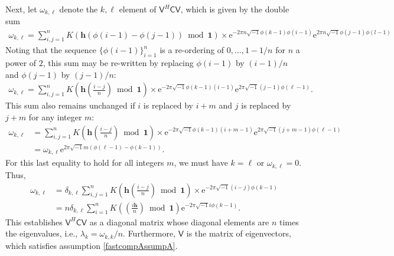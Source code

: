 \documentclass{iitthesis}          %
\newcommand{\bm}[1]{\boldsymbol{#1}}
\newcommand{\vh}{\bm{h}}
\newcommand{\vone}{\bm{1}}
\newcommand{\mC}{\mathsf{C}}
\newcommand{\mV}{\mathsf{V}}
\newcommand{\me}{\mathrm{e}}
\begin{document}
Next, let $\omega_{k, \ell}$ denote the $k,\ell$ element of $\mV^H \mC \mV$, which is given by the double sum
\begin{align*}
\omega_{k, \ell} = \sum_{i,j=1}^n K(\vh(\phi(i-1) - \phi(j-1)) \bmod \vone ) 
\times   \me^{-2 \pi n \sqrt{-1} \phi(k-1)\phi(i-1)}  \me^{2 \pi n \sqrt{-1} \phi(j-1)\phi(l-1)}
\end{align*}
Noting that the sequence $\{\phi(i-1)\}_{i=1}^n$ is a re-ordering of $0, \ldots, 1-1/n$ for $n$ a power of $2$, this sum may be re-written by replacing $\phi(i-1)$ by $(i-1)/n$ and $\phi(j-1)$ by $(j-1)/n$:
\begin{align*}
\omega_{k, \ell} = \sum_{i,j=1}^n K\left (\vh \left(\frac{i-j}{n} \right) \bmod \vone \right) 
\times   \me^{-2 \pi \sqrt{-1} \phi(k-1)(i-1)}  \me^{2 \pi \sqrt{-1} (j-1)\phi(\ell-1)}.
\end{align*}
This sum also remains unchanged if $i$ is replaced by $i+m$ and $j$ is replaced by $j+m$ for any integer $m$:
\begin{align*}
\omega_{k, \ell} &= \sum_{i,j=1}^n K\left (\vh \left(\frac{i-j}{n} \right) \bmod \vone \right) 
\times   \me^{-2 \pi \sqrt{-1} \phi(k-1)(i+m-1)}  \me^{2 \pi \sqrt{-1} (j+m-1)\phi(\ell-1)} \\
 &=   \omega_{k, \ell}  \me^{2 \pi \sqrt{-1} m(\phi(\ell-1) - \phi(k-1))}.
\end{align*}
For this last equality to hold for all integers $m$, we must have $k = \ell$ or $\omega_{k,\ell} = 0$.  Thus, 
\begin{align*}
\omega_{k, \ell} &= \delta_{k,\ell} \sum_{i,j=1}^n K\left (\vh \left(\frac{i-j}{n} \right) \bmod \vone \right) \times   \me^{-2 \pi \sqrt{-1} (i - j) \phi(k-1)} \\
& = n \delta_{k,\ell}  \sum_{i=1}^n K\left ( \left(\frac{i\vh}{n} \right) \bmod \vone \right)  \me^{-2 \pi \sqrt{-1} i \phi(k-1) }.
\end{align*}
This establishes $\mV^H \mC \mV$ as a diagonal matrix whose diagonal elements are $n$ times the eigenvalues, i.e., $\lambda_k = \omega_{k,k}/n$.  Furthermore, $\mV$ is the matrix of eigenvectors, which satisfies assumption \eqref{fastcompAssumpA}.
\end{document}
